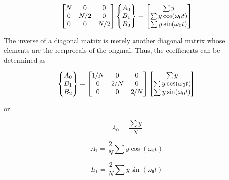 \documentclass[../main.tex]{subfiles}
\begin{document}
\begin{equation}
	\notag
	\begin{bmatrix}
		N & 0 & 0 \\
		0 & N/2 & 0 \\
		0 & 0 & N/2
	\end{bmatrix}
	\begin{Bmatrix}
		A_0 \\ B_1 \\ B_2
	\end{Bmatrix}
	=
	\begin{bmatrix}
		\sum y \\
		\sum y \cos(\omega_0 t) \\
		\sum y \sin(\omega_0 t)
	\end{bmatrix}
\end{equation}

\noindent The inverse of a diagonal matrix is merely another diagonal matrix whose elements are the
reciprocals of the original. Thus, the coefficients can be determined as

\begin{equation}
	\notag
	\begin{Bmatrix}
		A_0 \\ B_1 \\ B_2
	\end{Bmatrix}
	=
	\begin{bmatrix}
		1/N & 0 & 0 \\
		0 & 2/N & 0 \\
		0 & 0 & 2/N
	\end{bmatrix}
	\begin{bmatrix}
		\sum y \\
		\sum y \cos(\omega_0 t) \\
		\sum y \sin(\omega_0 t)
	\end{bmatrix}
\end{equation}

\noindent or

\begin{equation}
	\tag{16.14}
	A_0 = \frac{\sum y}{N}
\end{equation}

\begin{equation}
	\tag{16.15}
	A_1 =\frac{2}{N} \sum y \cos(\omega_0 t)
\end{equation}

\begin{equation}
	\tag{16.16}
	B_1 = \frac{2}{N} \sum y \sin(\omega_0 t)
\end{equation}
\end{document}
